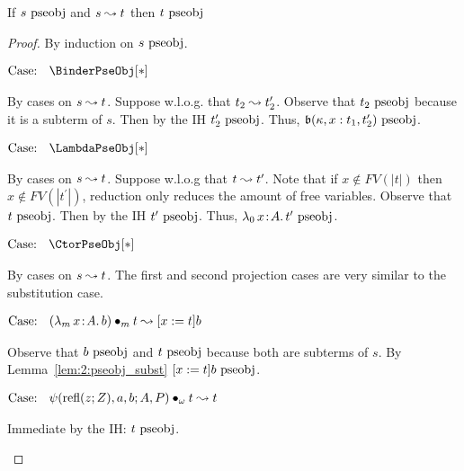 \begin{lemma}
    \label{lem:2:pseobj_preservation_step}
    If $s~\textnormal{pseobj}$ and $s \leadsto t$ then $t~\textnormal{pseobj}$
\end{lemma}
\begin{proof}
    By induction on $s~\textnormal{pseobj}$.

    $\text{Case: }\begin{array}{c} \BinderPseObj[*] \end{array}$
    \begin{proofcase}
        By cases on $s \leadsto t$. Suppose w.l.o.g. that $t_2 \leadsto t_2^\prime$.
        Observe that $t_2~\textnormal{pseobj}$ because it is a subterm of $s$.
        Then by the IH $t_2^\prime~\textnormal{pseobj}$.
        Thus, $\mathfrak{b}(\kappa, x : t_1, t_2^\prime) ~\textnormal{pseobj}$.
    \end{proofcase}

    $\text{Case: }\begin{array}{c} \LambdaPseObj[*] \end{array}$
    \begin{proofcase}
        By cases on $s \leadsto t$. Suppose w.l.o.g that $t \leadsto t^\prime$.
        Note that if $x \notin FV(|t|)$ then $x \notin FV(|t^\prime|)$, reduction only reduces the amount of free variables.
        Observe that $t ~\textnormal{pseobj}$.
        Then by the IH $t^\prime~\textnormal{pseobj}$.
        Thus, ${\lambda_0}\, x\! : \! A.\, t^\prime~\textnormal{pseobj}$.
    \end{proofcase}

    $\text{Case: }\begin{array}{c} \CtorPseObj[*] \end{array}$
    \begin{proofcase}
        By cases on $s \leadsto t$.
        The first and second projection cases are very similar to the substitution case.

        $\text{Case: }\begin{array}{c} ({\lambda_m}\, x\! : \! A.\, b) \bullet_{m} t \leadsto [x := t]b \end{array}$
        \begin{proofcase}
            Observe that $b~\textnormal{pseobj}$ and $t~\textnormal{pseobj}$ because both are subterms of $s$.
            By Lemma~\ref{lem:2:pseobj_subst} $[x := t]b~\textnormal{pseobj}$.
        \end{proofcase}

        $\text{Case: }\begin{array}{c} \psi(\text{refl}(z;Z), a, b; A, P) \bullet_{\omega} t \leadsto t \end{array}$
        \begin{proofcase}
            Immediate by the IH: $t~\textnormal{pseobj}$.
        \end{proofcase}


\end{proofcase}
\end{proof}
